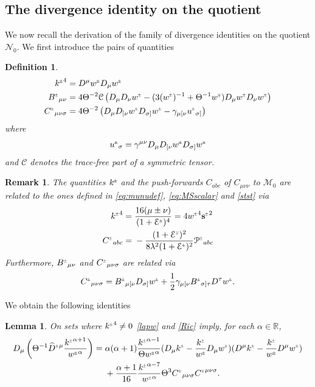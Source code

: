 \documentclass[a4paper,10pt,reqno]{amsart}
\newcommand{\cE}{\mathcal{E}}
\newcommand{\cM}{\mathcal{M}}
\newcommand{\cN}{\mathcal{N}}
\newcommand{\wh}{\widehat}
\newcommand{\Th}{\Theta}
\newcommand{\al}{\alpha}
\newcommand{\si}{\sigma}
\theoremstyle{plain}
\newtheorem{lemma}[thm]{Lemma}
\newtheorem{definition}[thm]{Definition}
\newtheorem{remark}[thm]{Remark}
\newcommand{\PM}[1]{{{#1}^{\hspace{-.5pt}\scaleto{\pm}{3.5pt}}}}
\newcommand{\MP}[1]{{{#1}^{\hspace{-.5pt}\scaleto{\mp}{3.5pt}}}}
\def\sbold{\mathbf{s}}
\numberwithin{equation}{section}
\begin{document}
\subsection{The divergence identity on the quotient} \label{sec:divid}
We now recall the derivation of the family of  divergence identities on the quotient $\cN_0$. We first introduce  the pairs of quantities
\begin{definition}
\begin{align}   
\PM{k}^{4} ={}& D^{\mu} \PM{w} D_{\mu}\PM{w} \\
\PM{B}_{\mu\nu} ={}& 4\Theta^{-2}\mathcal{C}
\left(D_{\mu}D_{\nu}\PM{w} - (3(\PM{w})^{-1} + \Theta^{-1} \MP{w})D_{\mu}\PM{w} D_{\nu}\PM{w}\right) \\
\PM{C}_{\mu\nu\si} ={}& 4\Theta^{-2}
\left(D_{\mu}D_{[\nu}\PM{w}D_{\sigma]}\PM{w} - \gamma_{\mu[\nu} \PM{u}_{\sigma]}\right)
\end{align}
where 
\begin{equation} 
\PM{u}_{\si} = \gamma^{\mu\nu} D_{\mu} D_{[\nu} \PM{w} D_{\si]} \PM{w}
\end{equation}
and  $\mathcal{ C}$ denotes the trace-free part of a symmetric tensor.
\end{definition}
\begin{remark}
The quantities $\PM{k}$ and the push-forwards $C_{abc}$ of $C_{\mu\nu\nu}$ to ${\cM}_0$ are related to the ones defined in  \eqref{eq:munudef}, \eqref{eq:MSscalar} and \eqref{stst} via
\begin{align}
\PM{k}^4  ={}& \frac{16 (\mu \pm \nu)}{(1 + \PM{\cE})^4} = 4 \PM{w}^4 \PM{\sbold}^2 \\
\PM{C}_{abc}  ={}& -  \frac{(1 + \MP{\cE})^2}{8 \lambda^2 (1 + \PM{\cE})^2} \PM{\mathcal{P}}_{abc}
\end{align}
Furthermore, $\PM{B}_{\mu\nu}$ and $\PM{C}_{\mu\nu\si}$ are related via 
\begin{align}
\PM{C}_{\mu\nu\si} = \PM{B}_{\mu[\nu} D_{\si]}\PM{w} + \frac{1}{2} \gamma_{\mu[\nu} \PM{B}_{\si]\tau} D^{\tau} \PM{w}.
\end{align}
\end{remark}
We obtain the following identities \cite{simon:1995}
\begin{lemma}
\label{lem:divid}
On sets where $\PM{k}^{4} \ne 0$ \eqref{lapw} and \eqref{Ric} imply,
for each $\al \in \mathbb{R}$,
\begin{align}
\label{ddkw}
D_{\mu}\left(\Th^{-1}  \PM{\wh D}{}^{\mu} \frac{\PM{k}^{\al + 1}}{\PM{w}^\al} \right)
={}& \al (\al + 1) \frac{\PM{k}^{\al - 1}}
{\Theta \PM{w}^{\al}}
(D_{\mu} \PM{k} - \frac{\PM{k}}{\PM{w}}D_{\mu}\PM{w})
(D^{\mu} \PM{k} - \frac{\PM{k}}{\PM{w}}D^{\mu}\PM{w})
\nonumber \\
& +\frac{\al + 1}{16} \frac{\PM{k}^{\al - 7}}{\PM{w}^{\al}}
\Theta^{3} \PM{C}_{\mu\nu\si} \PM{C}^{\mu\nu\si}.
\end{align}
\end{lemma}
\end{document}
